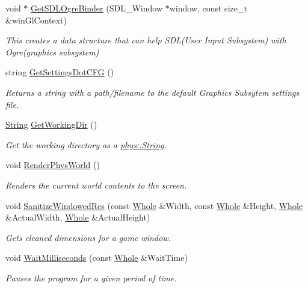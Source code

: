 \begin{DoxyCompactItemize}
void $\ast$ \hyperlink{namespacephys_1_1crossplatform_a16d9a4174cbcac20670925e3d60465da}{GetSDLOgreBinder} (SDL\_\-Window $\ast$window, const size\_\-t \&winGlContext)
\begin{DoxyCompactList}\small\item\em This creates a data structure that can help SDL(User Input Subsystem) with Ogre(graphics subsystem) \item\end{DoxyCompactList}\item 
string \hyperlink{namespacephys_1_1crossplatform_a2d43f3aa5a485564c3f375b36a08152f}{GetSettingsDotCFG} ()
\begin{DoxyCompactList}\small\item\em Returns a string with a path/filename to the default Graphics Subsytem settings file. \item\end{DoxyCompactList}\item 
\hyperlink{namespacephys_aa03900411993de7fbfec4789bc1d392e}{String} \hyperlink{namespacephys_1_1crossplatform_aa13f8bf79ac9313095e9a1b935ef3a10}{GetWorkingDir} ()
\begin{DoxyCompactList}\small\item\em Get the working directory as a \hyperlink{namespacephys_aa03900411993de7fbfec4789bc1d392e}{phys::String}. \item\end{DoxyCompactList}\item 
void \hyperlink{namespacephys_1_1crossplatform_a7c0ef3957423db484714c3356603c09d}{RenderPhysWorld} ()
\begin{DoxyCompactList}\small\item\em Renders the current world contents to the screen. \item\end{DoxyCompactList}\item 
void \hyperlink{namespacephys_1_1crossplatform_ab8bf982a60b008f32c91c90354efc162}{SanitizeWindowedRes} (const \hyperlink{namespacephys_a460f6bc24c8dd347b05e0366ae34f34a}{Whole} \&Width, const \hyperlink{namespacephys_a460f6bc24c8dd347b05e0366ae34f34a}{Whole} \&Height, \hyperlink{namespacephys_a460f6bc24c8dd347b05e0366ae34f34a}{Whole} \&ActualWidth, \hyperlink{namespacephys_a460f6bc24c8dd347b05e0366ae34f34a}{Whole} \&ActualHeight)
\begin{DoxyCompactList}\small\item\em Gets cleaned dimensions for a game window. \item\end{DoxyCompactList}\item 
void \hyperlink{namespacephys_1_1crossplatform_ab525e3abf3625b83954e2d55a5869d18}{WaitMilliseconds} (const \hyperlink{namespacephys_a460f6bc24c8dd347b05e0366ae34f34a}{Whole} \&WaitTime)
\begin{DoxyCompactList}\small\item\em Pauses the program for a given period of time. \item\end{DoxyCompactList}\end{DoxyCompactItemize}


